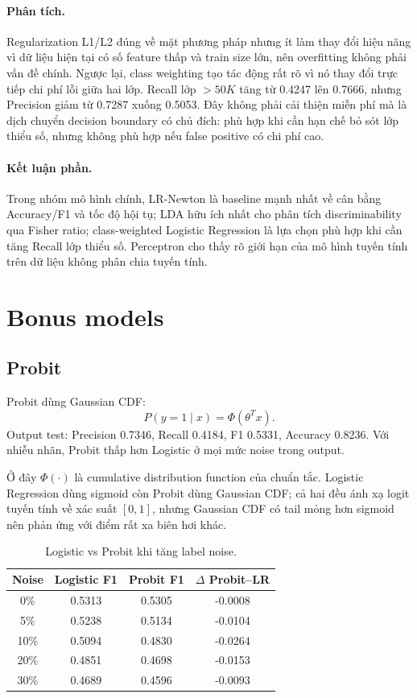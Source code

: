 \documentclass[12pt,a4paper]{article}
\begin{document}
\paragraph{Phân tích.}
Regularization L1/L2 đúng về mặt phương pháp nhưng ít làm thay đổi hiệu năng vì dữ liệu hiện tại có số feature thấp và train size lớn, nên overfitting không phải vấn đề chính. Ngược lại, class weighting tạo tác động rất rõ vì nó thay đổi trực tiếp chi phí lỗi giữa hai lớp. Recall lớp $>50K$ tăng từ 0.4247 lên 0.7666, nhưng Precision giảm từ 0.7287 xuống 0.5053. Đây không phải cải thiện miễn phí mà là dịch chuyển decision boundary có chủ đích: phù hợp khi cần hạn chế bỏ sót lớp thiểu số, nhưng không phù hợp nếu false positive có chi phí cao.

\paragraph{Kết luận phần.}
Trong nhóm mô hình chính, LR-Newton là baseline mạnh nhất về cân bằng Accuracy/F1 và tốc độ hội tụ; LDA hữu ích nhất cho phân tích discriminability qua Fisher ratio; class-weighted Logistic Regression là lựa chọn phù hợp khi cần tăng Recall lớp thiểu số. Perceptron cho thấy rõ giới hạn của mô hình tuyến tính trên dữ liệu không phân chia tuyến tính.

\section{Bonus models}

\subsection{Probit}

Probit dùng Gaussian CDF:
\begin{equation}
 P(y=1\mid x)=\Phi(\theta^Tx).
\end{equation}
Output test: Precision 0.7346, Recall 0.4184, F1 0.5331, Accuracy 0.8236. Với nhiễu nhãn, Probit thấp hơn Logistic ở mọi mức noise trong output.

Ở đây $\Phi(\cdot)$ là cumulative distribution function của chuẩn tắc. Logistic Regression dùng sigmoid còn Probit dùng Gaussian CDF; cả hai đều ánh xạ logit tuyến tính về xác suất $[0,1]$, nhưng Gaussian CDF có tail mỏng hơn sigmoid nên phản ứng với điểm rất xa biên hơi khác.

\begin{table}[htbp]
\centering
\caption{Logistic vs Probit khi tăng label noise.}
\begin{tabular}{cccc}
\toprule
\textbf{Noise} & \textbf{Logistic F1} & \textbf{Probit F1} & \textbf{$\Delta$ Probit--LR} \\
\midrule
0\% & 0.5313 & 0.5305 & -0.0008 \\
5\% & 0.5238 & 0.5134 & -0.0104 \\
10\% & 0.5094 & 0.4830 & -0.0264 \\
20\% & 0.4851 & 0.4698 & -0.0153 \\
30\% & 0.4689 & 0.4596 & -0.0093 \\
\bottomrule
\end{tabular}
\end{table}
\end{document}
